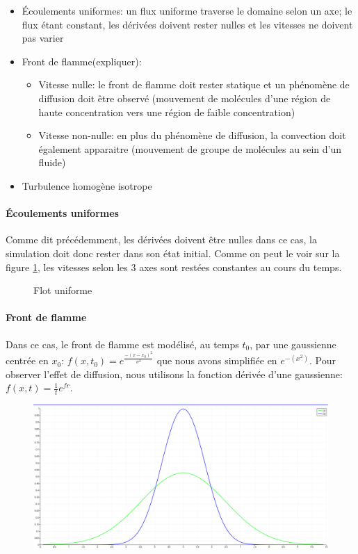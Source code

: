 \begin{itemize}
\item Écoulements uniformes: un flux uniforme traverse le domaine selon un axe; le flux étant constant, les dérivées doivent rester nulles et les vitesses ne doivent pas varier
\item Front de flamme(expliquer):
  \begin{itemize}
  \item Vitesse nulle: le front de flamme doit rester statique et un phénomène de diffusion doit être observé (mouvement de molécules d'une région de haute concentration vers une région de faible concentration)
  \item Vitesse non-nulle: en plus du phénomène de diffusion, la convection doit également apparaitre (mouvement de groupe de molécules au sein d'un fluide)
  \end{itemize}
\item Turbulence homogène isotrope
\end{itemize}

\paragraph{Écoulements uniformes}
Comme dit précédemment, les dérivées doivent être nulles dans ce cas, la simulation doit donc rester dans son état initial. Comme on peut le voir sur la figure \ref{fig:uniform_flow}, les vitesses selon les 3 axes sont restées constantes au cours du temps.
 
\begin{figure}[ht]
  \centering
  \caption{\label{fig:uniform_flow}Flot uniforme}
\end{figure}

\paragraph{Front de flamme}
Dans ce cas, le front de flamme est modélisé, au temps $t_0$, par une gaussienne centrée en $x_0$: $f(x,t_0)=e^{\frac{-(x-x_0)^2}{\sigma^2}}$ que nous avons simplifiée en $e^{-(x^2)}$. Pour observer l'effet de diffusion, nous utilisons la fonction dérivée d'une gaussienne: $f(x,t)=\frac{1}{t}e^{fr}$.

\begin{figure}[ht]
  \centering
  \includegraphics[scale=0.15]{figures/diff.png}
  \caption{\label{fig:diff} }
\end{figure}




